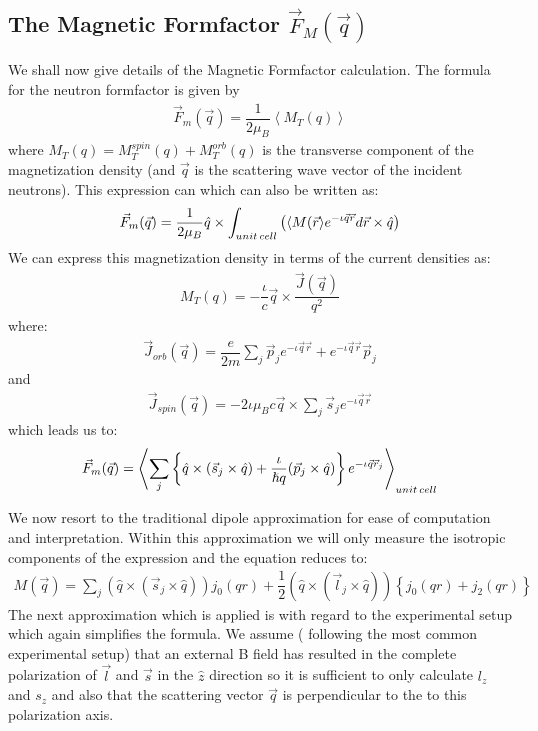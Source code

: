 \documentclass[10pt]{ruthesis}
\begin{document}
{\subsection{The Magnetic Formfactor $\vec{F}_{M}(\vec{q})$}
We shall now give details of the Magnetic Formfactor calculation. The formula for the neutron formfactor is given by 
\begin{align}
\vec{F}_{m}(\vec{q})=\dfrac{1}{2\mu_{B}} \left \langle M_{T}(q) \right \rangle
\end{align}
where $M_{T}(q)=M_{T}^{spin}(q)+M_{T}^{orb}(q)$ is the transverse component of the magnetization density (and $\vec{q}$ is the scattering wave vector of the incident neutrons). This expression can which can also be written as:
\begin{align}
\vec{F}_{m}(\vec q)=\dfrac{1}{2\mu_{B}} \hat{q} \times \int_{unit \hspace{0.5mm} cell} \left(\langle M(\vec{r}\rangle e^{-\iota \vec{q}\vec{r}} d \vec{r} \times \hat{q} \right)
\end{align}
 We can express this magnetization density  in terms of the current densities as:
 \begin{align}
 M_{T}(q)=-\dfrac{\iota}{c}\vec{q} \times \dfrac{\vec{J}(\vec{q})}{q^{2}}
 \end{align}
where:
\begin{align}
\vec{J}_{orb}(\vec{q})=\dfrac{e}{2m}\sum_{j} \vec p_{j}e^{-\iota \vec{q}\vec{r}} + e^{-\iota \vec{q}\vec{r}} \vec{p}_{j}
\end{align}
and 
\begin{align}
\vec{J}_{spin}(\vec{q})=-2\iota \mu_{B} c \vec{q} \times \sum_{j} \vec{s}_{j}e^{-\iota \vec{q}\vec{r}}
\end{align}
 which leads us to:
\begin{align}
\vec{F}_{m}(\vec q)= \left \langle \sum_{j} \left \lbrace \hat{q} \times (\vec{s}_{j} \times \hat{q}) + \dfrac{\iota}{\hslash q}(\vec{p}_{j} \times \hat{q}) \right \rbrace e^{-\iota \vec{q}\vec{r}_{j}} \right \rangle _{ unit \hspace{0.5mm} cell}
\end{align}

 We now resort to the traditional dipole approximation for ease of computation and interpretation. Within this approximation we will only measure the isotropic components of the expression and the equation reduces to:
\begin{align}
M(\vec{q})= \sum_{j}  \left( \hat{q} \times (\vec{s}_{j} \times \hat{q}) \right) j_{0}(qr)+ \dfrac{1}{2}\left( \hat{q}\times (\vec{l}_{j} \times \hat{q}) \right) \left \lbrace j_{0}(qr) +j_{2}(qr) \right \rbrace
\end{align}
The next approximation which is applied is with regard to the experimental setup which again simplifies the formula. We assume ( following the most common experimental setup) that an external B field has resulted in the complete polarization of $\vec{l}$ and $\vec{s}$ in the $\hat{z}$ direction so it is sufficient to only calculate $l_{z}$ and $s_{z}$ and also that the scattering vector $\vec{q}$ is perpendicular to the to this polarization axis. 

}
\end{document}
